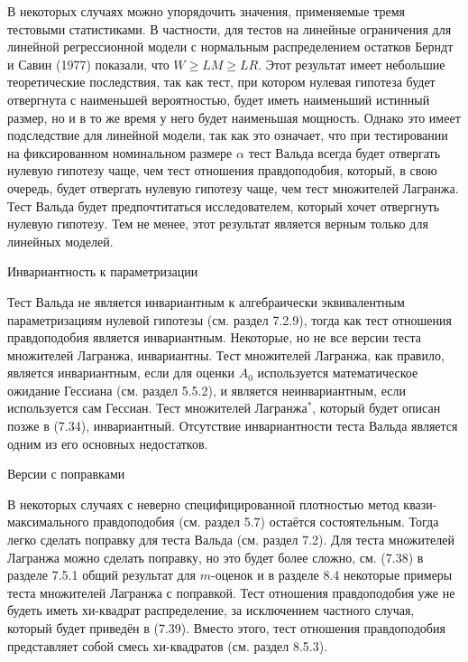 В некоторых случаях можно упорядочить значения, применяемые тремя тестовыми статистиками. В частности, для тестов на линейные ограничения для линейной регрессионной модели с нормальным распределением остатков Берндт и Савин (1977) показали, что $W \geq LM \geq LR$. Этот результат имеет небольшие теоретические последствия, так как 
тест, при котором нулевая гипотеза будет отвергнута с наименьшей вероятностью, будет иметь наименьший истинный размер, но и в то же время у него будет наименьшая мощность. Однако это имеет подследствие для линейной модели, так как это означает, что при тестировании на фиксированном номинальном размере $\alpha$ тест Вальда всегда будет отвергать нулевую гипотезу чаще, чем тест отношения правдоподобия, который, в свою очередь, будет отвергать нулевую гипотезу чаще, чем тест множителей Лагранжа. Тест Вальда будет предпочтитаться исследователем, который хочет отвергнуть нулевую гипотезу. Тем не менее, этот результат является верным только для линейных моделей.

\begin{center}
Инвариантность к параметризации 
\end{center}

Тест Вальда не является инвариантным к алгебраически эквивалентным параметризациям нулевой гипотезы (см. раздел 7.2.9), тогда как тест отношения правдоподобия является инвариантным. Некоторые, но не все версии теста множителей Лагранжа, инвариантны. Тест множителей Лагранжа, как правило, является инвариантным, если для оценки $A_0$ используется математическое ожидание Гессиана (см. раздел 5.5.2), и является неинвариантным, если используется сам Гессиан. Тест множителей Лагранжа$^*$, который будет описан позже в (7.34), инвариантный. Отсутствие инвариантности теста Вальда является одним из его основных недостатков.

\begin{center}
Версии с поправками
\end{center}

В некоторых случаях с неверно специфицированной плотностью метод квази-максимального правдоподобия (см. раздел 5.7) остаётся состоятельным. Тогда легко сделать поправку для теста Вальда (см. раздел 7.2). Для теста множителей Лагранжа можно сделать поправку, но это будет более сложно, см. (7.38) в разделе 7.5.1 общий результат для $m$-оценок и в разделе 8.4 некоторые примеры теста множителей Лагранжа с поправкой. Тест отношения правдоподобия уже не будеть иметь хи-квадрат распределение, за исключением частного случая, который будет приведён в (7.39). Вместо этого, тест отношения правдоподобия представляет собой смесь хи-квадратов (см. раздел 8.5.3).

